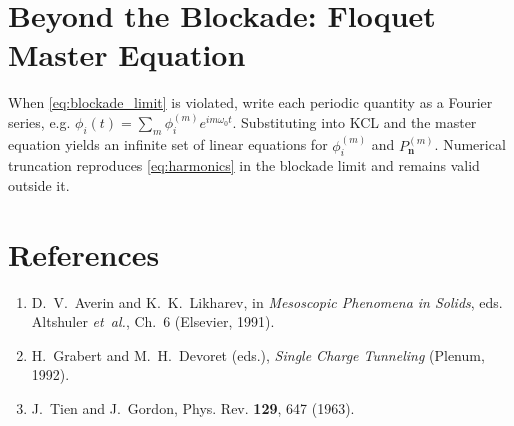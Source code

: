 \documentclass[11pt]{article}
\newcommand{\vect}[1]{\bm{#1}}
\begin{document}
\section{Beyond the Blockade: Floquet Master Equation}
\label{sec:floquet}
When \eqref{eq:blockade_limit} is violated, write each periodic quantity as a Fourier series, e.g.
\(\phi_i(t)=\sum_m \phi_i^{(m)}e^{im\omega_0 t}\).  Substituting into KCL and the master equation yields an infinite set of linear equations for $\phi_i^{(m)}$ and $P_{\vect n}^{(m)}$. Numerical truncation reproduces \eqref{eq:harmonics} in the blockade limit and remains valid outside it.

\section{References}
\begin{enumerate}
 \item D.~V.~Averin and K.~K.~Likharev, in \emph{Mesoscopic Phenomena in Solids}, eds. Altshuler \emph{et al.}, Ch.~6 (Elsevier, 1991).
 \item H.~Grabert and M.~H.~Devoret (eds.), \emph{Single Charge Tunneling} (Plenum, 1992).
 \item J.~Tien and J.~Gordon, Phys. Rev. \textbf{129}, 647 (1963).
\end{enumerate}
\end{document}
